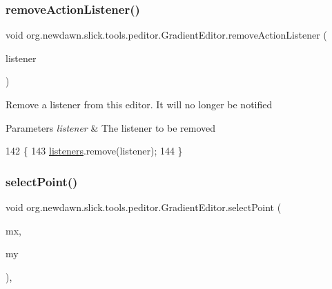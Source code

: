 \subsubsection{\texorpdfstring{remove\+Action\+Listener()}{removeActionListener()}}
{\footnotesize\ttfamily void org.\+newdawn.\+slick.\+tools.\+peditor.\+Gradient\+Editor.\+remove\+Action\+Listener (\begin{DoxyParamCaption}\item[{Action\+Listener}]{listener }\end{DoxyParamCaption})\hspace{0.3cm}{\ttfamily [inline]}}

Remove a listener from this editor. It will no longer be notified


\begin{DoxyParams}{Parameters}
{\em listener} & The listener to be removed \\
\hline
\end{DoxyParams}

\begin{DoxyCode}
142                                                               \{
143         \mbox{\hyperlink{classorg_1_1newdawn_1_1slick_1_1tools_1_1peditor_1_1_gradient_editor_a9df94248f3547e312d52a7d3fd3568f5}{listeners}}.remove(listener);
144     \}
\end{DoxyCode}
\mbox{\label{classorg_1_1newdawn_1_1slick_1_1tools_1_1peditor_1_1_gradient_editor_acbffda211357cbe269f4d3390e7e0bb8}} 
\subsubsection{\texorpdfstring{select\+Point()}{selectPoint()}}
{\footnotesize\ttfamily void org.\+newdawn.\+slick.\+tools.\+peditor.\+Gradient\+Editor.\+select\+Point (\begin{DoxyParamCaption}\item[{int}]{mx,  }\item[{int}]{my }\end{DoxyParamCaption})\hspace{0.3cm}{\ttfamily [inline]}, {\ttfamily [private]}}

